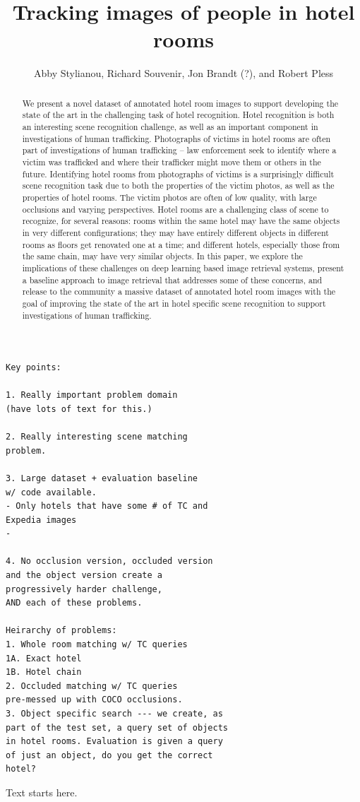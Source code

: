 \documentclass[letterpaper]{article} %
\begin{document}
%
\title{Tracking images of people in hotel rooms}
\author{Abby Stylianou, Richard Souvenir, Jon Brandt (?), and Robert Pless}
\maketitle
\begin{abstract}
We present a novel dataset of annotated hotel room images to support developing the state of the art in the challenging task of hotel recognition. Hotel recognition is both an interesting scene recognition challenge, as well as an important component in investigations of human trafficking. Photographs of victims in hotel rooms are often part of investigations of human trafficking -- law enforcement seek to identify where a victim was trafficked and where their trafficker might move them or others in the future. Identifying hotel rooms from photographs of victims is a surprisingly difficult scene recognition task due to both the properties of the victim photos, as well as the properties of hotel rooms. The victim photos are often of low quality, with large occlusions and varying perspectives. Hotel rooms are a challenging class of scene to recognize, for several reasons: rooms within the same hotel may have the same objects in very different configurations; they may have entirely different objects in different rooms as floors get renovated one at a time; and different hotels, especially those from the same chain, may have very similar objects. In this paper, we explore the implications of these challenges on deep learning based image retrieval systems, present a baseline approach to image retrieval that addresses some of these concerns, and release to the community a massive dataset of annotated hotel room images with the goal of improving the state of the art in hotel specific scene recognition to support investigations of human trafficking.
\end{abstract}

\begin{verbatim}
Key points:

1. Really important problem domain 
(have lots of text for this.)

2. Really interesting scene matching 
problem.

3. Large dataset + evaluation baseline 
w/ code available.
- Only hotels that have some # of TC and 
Expedia images
- 

4. No occlusion version, occluded version
and the object version create a 
progressively harder challenge, 
AND each of these problems.

Heirarchy of problems:
1. Whole room matching w/ TC queries
1A. Exact hotel
1B. Hotel chain
2. Occluded matching w/ TC queries 
pre-messed up with COCO occlusions.
3. Object specific search --- we create, as 
part of the test set, a query set of objects
in hotel rooms. Evaluation is given a query
of just an object, do you get the correct 
hotel?
\end{verbatim}
\noindent Text starts here.~\cite{netdissect2017}
\end{document}
